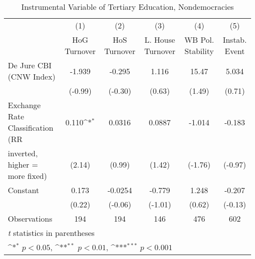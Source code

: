 \begin{table}[htbp]\centering
\def\sym#1{\ifmmode^{#1}\else\(^{#1}\)\fi}
\caption{Instrumental Variable of Tertiary Education, Nondemocracies \label{ndemIfivs}}
\begin{tabular}{l*{5}{c}}
\toprule
                                        &\multicolumn{1}{c}{(1)}&\multicolumn{1}{c}{(2)}&\multicolumn{1}{c}{(3)}&\multicolumn{1}{c}{(4)}&\multicolumn{1}{c}{(5)}\\
                                        &\multicolumn{1}{c}{HoG Turnover}&\multicolumn{1}{c}{HoS Turnover}&\multicolumn{1}{c}{L. House Turnover}&\multicolumn{1}{c}{WB Pol. Stability}&\multicolumn{1}{c}{Instab. Event}\\
\midrule
De Jure CBI (CNW Index)                 &   -1.939         &   -0.295         &    1.116         &    15.47         &    5.034         \\
                                        &  (-0.99)         &  (-0.30)         &   (0.63)         &   (1.49)         &   (0.71)         \\
\addlinespace
Exchange Rate Classification (RR        &    0.110\sym{*}  &   0.0316         &   0.0887         &   -1.014         &   -0.183         \\
inverted, higher = more fixed)          &   (2.14)         &   (0.99)         &   (1.42)         &  (-1.76)         &  (-0.97)         \\
\addlinespace
Constant                                &    0.173         &  -0.0254         &   -0.779         &    1.248         &   -0.207         \\
                                        &   (0.22)         &  (-0.06)         &  (-1.01)         &   (0.62)         &  (-0.13)         \\
\midrule
Observations                            &      194         &      194         &      146         &      476         &      602         \\
\bottomrule
\multicolumn{6}{l}{\footnotesize \textit{t} statistics in parentheses}\\
\multicolumn{6}{l}{\footnotesize \sym{*} \(p<0.05\), \sym{**} \(p<0.01\), \sym{***} \(p<0.001\)}\\
\end{tabular}
\end{table}
